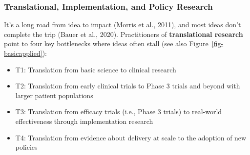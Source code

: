 \documentclass[
  letterpaper,
  DIV=11,
  numbers=noendperiod,
  oneside]{scrreprt}
\providecommand{\tightlist}{%
  \setlength{\itemsep}{0pt}\setlength{\parskip}{0pt}}\usepackage{longtable,booktabs,array}
\begin{document}
\hypertarget{translational-implementation-and-policy-research}{%
\subsubsection*{Translational, Implementation, and Policy
Research}\label{translational-implementation-and-policy-research}}

It's a long road from idea to impact (Morris et al.,
2011),
and most ideas don't complete the trip (Bauer et al.,
2020).
Practitioners of \textbf{translational research} point to four key
bottlenecks where ideas often stall (see also
Figure~\ref{fig-basicapplied}):

\begin{itemize}
\tightlist
\item
  T1: Translation from basic science to clinical research
\item
  T2: Translation from early clinical trials to Phase 3 trials and
  beyond with larger patient populations
\item
  T3: Translation from efficacy trials (i.e., Phase 3 trials) to
  real-world effectiveness through implementation research
\item
  T4: Translation from evidence about delivery at scale to the adoption
  of new policies
\end{itemize}
\end{document}
